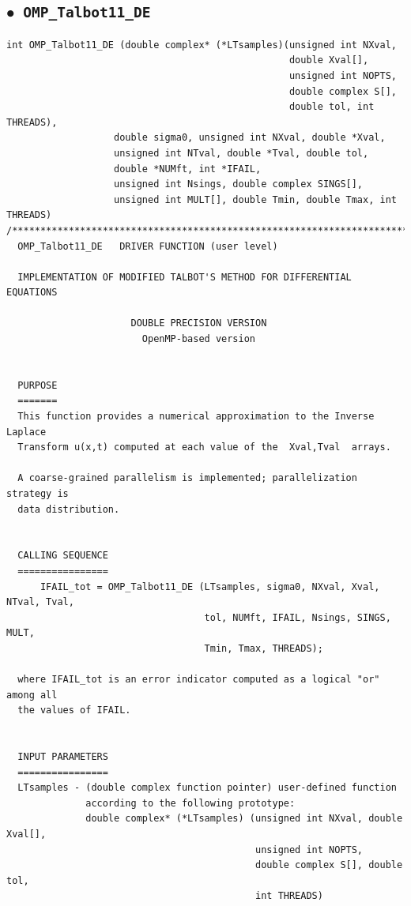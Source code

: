 \documentclass[a4paper,10pt]{report}%
\begin{document}
\subsection{\texorpdfstring{$\boldsymbol{\bullet}$}{ - }{\tt\ OMP\_Talbot11\_DE}}
\begin{lstlisting}
int OMP_Talbot11_DE (double complex* (*LTsamples)(unsigned int NXval,
                                                  double Xval[],
                                                  unsigned int NOPTS,
                                                  double complex S[],
                                                  double tol, int THREADS),
                   double sigma0, unsigned int NXval, double *Xval,
                   unsigned int NTval, double *Tval, double tol,
                   double *NUMft, int *IFAIL,
                   unsigned int Nsings, double complex SINGS[],
                   unsigned int MULT[], double Tmin, double Tmax, int THREADS)
/*****************************************************************************
  OMP_Talbot11_DE   DRIVER FUNCTION (user level)

  IMPLEMENTATION OF MODIFIED TALBOT'S METHOD FOR DIFFERENTIAL EQUATIONS

                      DOUBLE PRECISION VERSION
                        OpenMP-based version


  PURPOSE
  =======
  This function provides a numerical approximation to the Inverse Laplace
  Transform u(x,t) computed at each value of the  Xval,Tval  arrays.

  A coarse-grained parallelism is implemented; parallelization strategy is
  data distribution.


  CALLING SEQUENCE
  ================
      IFAIL_tot = OMP_Talbot11_DE (LTsamples, sigma0, NXval, Xval, NTval, Tval,
                                   tol, NUMft, IFAIL, Nsings, SINGS, MULT,
                                   Tmin, Tmax, THREADS);

  where IFAIL_tot is an error indicator computed as a logical "or" among all
  the values of IFAIL.


  INPUT PARAMETERS
  ================
  LTsamples - (double complex function pointer) user-defined function
              according to the following prototype:
              double complex* (*LTsamples) (unsigned int NXval, double Xval[],
                                            unsigned int NOPTS,
                                            double complex S[], double tol,
                                            int THREADS)


\end{lstlisting}
\end{document}
